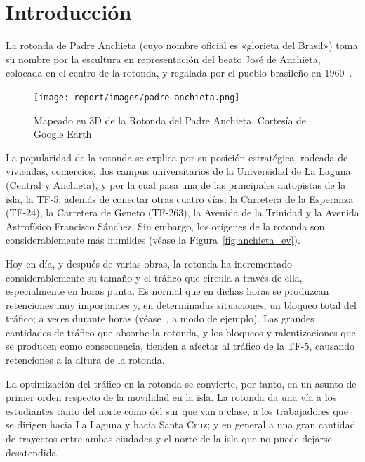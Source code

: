 \chapter{Introducción}
\label{cap:intro}

La rotonda de Padre Anchieta (cuyo nombre oficial es «glorieta del Brasil») toma su nombre por la escultura en representación del beato José de Anchieta, colocada en el centro de la rotonda, y regalada por el pueblo brasileño en 1960~\cite{gallo_glorieta_2013}.

\begin{figure}[H]
    \centering
    \texttt{[image: report/images/padre-anchieta.png]}
    \caption[Mapeado en 3D de la Rotonda del Padre Anchieta.]{Mapeado en 3D de la Rotonda del Padre Anchieta. Cortesía de Google Earth\protect\footnotemark}
    \label{fig:padre_anchieta_3d}
\end{figure}


La popularidad de la rotonda se explica por su posición estratégica, rodeada de viviendas, comercios, dos campus universitarios de la Universidad de La Laguna (Central y Anchieta), y por la cual pasa una de las principales autopistas de la isla, la TF-5; además de conectar otras cuatro vías: la Carretera de la Esperanza (TF-24), la Carretera de Geneto (TF-263), la Avenida de la Trinidad y la Avenida Astrofísico Francisco Sánchez. Sin embargo, los orígenes de la rotonda son considerablemente más humildes (véase la Figura~\ref{fig:anchieta_ev}).

Hoy en día, y después de varias obras, la rotonda ha incrementado considerablemente su tamaño y el tráfico que circula a través de ella, especialmente en horas punta. Es normal que en dichas horas se produzcan retenciones muy importantes y, en determinadas situaciones, un bloqueo total del tráfico; a veces durante horas (véase~\cite{gulesserian_vuelven_2018}, a modo de ejemplo). Las grandes cantidades de tráfico que absorbe la rotonda, y los bloqueos y ralentizaciones que se producen como consecuencia, tienden a afectar al tráfico de la TF-5, causando retenciones a la altura de la rotonda.

La optimización del tráfico en la rotonda se convierte, por tanto, en un asunto de primer orden respecto de la movilidad en la isla. La rotonda da una vía a los estudiantes tanto del norte como del sur que van a clase, a los trabajadores que se dirigen hacia La Laguna y hacia Santa Cruz; y en general a una gran cantidad de trayectos entre ambas ciudades y el norte de la isla que no puede dejarse desatendida.

